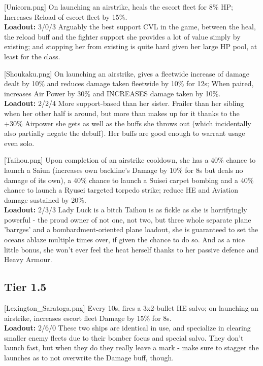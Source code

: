 [Unicorn.png]
{On launching an airstrike, heals the escort fleet for 8\% HP; Increases Reload of escort fleet by 15\%.\\
\textbf{Loadout:} 3/0/3}
{}
{Arguably the best support CVL in the game, between the heal, the reload buff and the fighter support she provides a lot of value simply by existing; and stopping her from existing is quite hard given her large HP pool, at least for the class.}

[Shoukaku.png]
{On launching an airstrike, gives a fleetwide increase of damage dealt by 10\% and reduces damage taken fleetwide by 10\% for 12s; When paired, increases Air Power by 30\% and INCREASES damage taken by 10\%.\\
\textbf{Loadout:} 2/2/4}
{}
{More support-based than her sister. Frailer than her sibling when her other half is around, but more than makes up for it thanks to the +30\% Airpower she gets as well as the buffs she throws out (which incidentally also partially negate the debuff). Her buffs are good enough to warrant usage even solo.}

[Taihou.png]
{Upon completion of an airstrike cooldown, she has a 40\% chance to launch a Saiun (increases own backline's Damage by 10\% for 8s but deals no damage of its own), a 40\% chance to launch a Suisei carpet bombing and a 40\% chance to launch a Ryusei targeted torpedo strike; reduce HE and Aviation damage sustained by 20\%.\\
\textbf{Loadout:} 2/3/3}
{Lady Luck is a bitch}
{Taihou is as fickle as she is horrifyingly powerful - the proud owner of not one, not two, but three whole separate plane 'barrges' and a bombardment-oriented plane loadout, she is guaranteed to set the oceans ablaze multiple times over, if given the chance to do so. And as a nice little bonus, she won't ever feel the heat herself thanks to her passive defence and Heavy Armour.}


\newpage
\subsection{Tier 1.5}
[Lexington_Saratoga.png]
{ Every 10s, fires a 3x2-bullet HE salvo; on launching an airstrike, increases escort fleet Damage by 15\% for 8s.\\
\textbf{Loadout:} 2/6/0}
{}
{These two ships are identical in use, and specialize in clearing smaller enemy fleets due to their bomber focus and special salvo. They don't launch fast, but when they do they really leave a mark - make sure to stagger the launches as to not overwrite the Damage buff, though.}
 
